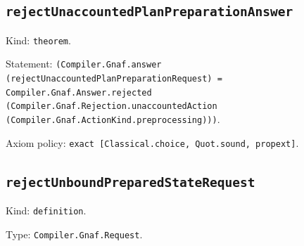 \documentclass[11pt]{article}
\begin{document}
\subsection*{\texttt{rejectUnaccountedPlanPreparationAnswer}}
\noindent Kind: \texttt{theorem}.\par
\noindent Statement: \texttt{(Compiler.Gnaf.answer (rejectUnaccountedPlanPreparationRequest) = Compiler.Gnaf.Answer.rejected (Compiler.Gnaf.Rejection.unaccountedAction (Compiler.Gnaf.ActionKind.preprocessing)))}.\par
\noindent Axiom policy: \texttt{exact [Classical.choice, Quot.sound, propext]}.\par
\subsection*{\texttt{rejectUnboundPreparedStateRequest}}
\noindent Kind: \texttt{definition}.\par
\noindent Type: \texttt{Compiler.Gnaf.Request}.\par
\end{document}
